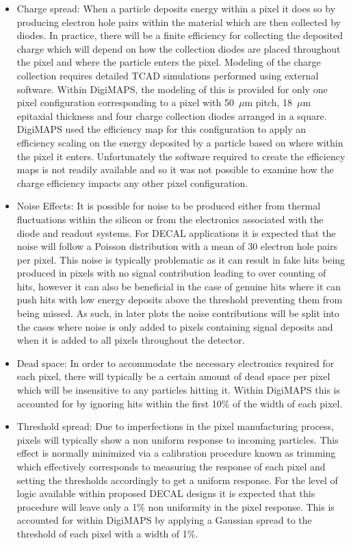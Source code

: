 \begin{itemize}
\item Charge spread: When a particle deposits energy within a pixel it does so by producing electron hole pairs within the material which are then collected by diodes. In practice, there will be a finite efficiency for collecting the deposited charge which will depend on how the collection diodes are placed throughout the pixel and where the particle enters the pixel. Modeling of the charge collection requires detailed TCAD simulations performed using external software. Within DigiMAPS, the modeling of this is provided for only one pixel configuration corresponding to a pixel with 50~$\mu$m pitch, 18~$\mu$m epitaxial thickness and four charge collection diodes arranged in a square. DigiMAPS used the efficiency map for this configuration to apply an efficiency scaling on the energy deposited by a particle based on where within the pixel it enters. Unfortunately the software required to create the efficiency maps is not readily available and so it was not possible to examine how the charge efficiency impacts any other pixel configuration.
  
\item Noise Effects: It is possible for noise to be produced either from thermal fluctuations within the silicon or from the electronics associated with the diode and readout systems. For \ac{DECAL} applications it is expected that the noise will follow a Poisson distribution with a mean of 30 electron hole pairs per pixel. This noise is typically problematic as it can result in fake hits being produced in pixels with no signal contribution leading to over counting of hits, however it can also be beneficial in the case of genuine hits where it can push hits with low energy deposits above the threshold preventing them from being missed. As such, in later plots the noise contributions will be split into the cases where noise is only added to pixels containing signal deposits and when it is added to all pixels throughout the detector.
  
\item Dead space: In order to accommodate the necessary electronics required for each pixel, there will typically be a certain amount of dead space per pixel which will be insensitive to any particles hitting it. Within DigiMAPS this is accounted for by ignoring hits within the first 10\% of the width of each pixel.
  
\item Threshold spread: Due to imperfections in the pixel manufacturing process, pixels will typically show a non uniform response to incoming particles. This effect is normally minimized via a calibration procedure known as trimming which effectively corresponds to measuring the response of each pixel and setting the thresholds accordingly to get a uniform response. For the level of logic available within proposed \ac{DECAL} designs it is expected that this procedure will leave only a 1\% non uniformity in the pixel response. This is accounted for within DigiMAPS by applying a Gaussian spread to the threshold of each pixel with a width of 1\%.
  

\end{itemize}
